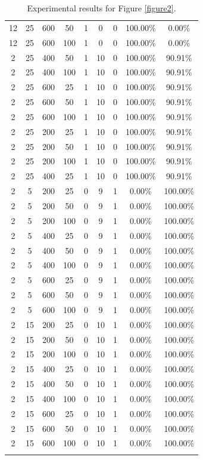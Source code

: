 {\begin{longtable}{| c | c | c | c | c | c | c | c | c |}
12 & 25 & 600 & 50 & 1 & 0 & 0 & 100.00\% & 0.00\% \\
12 & 25 & 600 & 100 & 1 & 0 & 0 & 100.00\% & 0.00\% \\
2 & 25 & 400 & 50 & 1 & 10 & 0 & 100.00\% & 90.91\% \\
2 & 25 & 400 & 100 & 1 & 10 & 0 & 100.00\% & 90.91\% \\
2 & 25 & 600 & 25 & 1 & 10 & 0 & 100.00\% & 90.91\% \\
2 & 25 & 600 & 50 & 1 & 10 & 0 & 100.00\% & 90.91\% \\
2 & 25 & 600 & 100 & 1 & 10 & 0 & 100.00\% & 90.91\% \\
2 & 25 & 200 & 25 & 1 & 10 & 0 & 100.00\% & 90.91\% \\
2 & 25 & 200 & 50 & 1 & 10 & 0 & 100.00\% & 90.91\% \\
2 & 25 & 200 & 100 & 1 & 10 & 0 & 100.00\% & 90.91\% \\
2 & 25 & 400 & 25 & 1 & 10 & 0 & 100.00\% & 90.91\% \\
2 & 5 & 200 & 25 & 0 & 9 & 1 & 0.00\% & 100.00\% \\
2 & 5 & 200 & 50 & 0 & 9 & 1 & 0.00\% & 100.00\% \\
2 & 5 & 200 & 100 & 0 & 9 & 1 & 0.00\% & 100.00\% \\
2 & 5 & 400 & 25 & 0 & 9 & 1 & 0.00\% & 100.00\% \\
2 & 5 & 400 & 50 & 0 & 9 & 1 & 0.00\% & 100.00\% \\
2 & 5 & 400 & 100 & 0 & 9 & 1 & 0.00\% & 100.00\% \\
2 & 5 & 600 & 25 & 0 & 9 & 1 & 0.00\% & 100.00\% \\
2 & 5 & 600 & 50 & 0 & 9 & 1 & 0.00\% & 100.00\% \\
2 & 5 & 600 & 100 & 0 & 9 & 1 & 0.00\% & 100.00\% \\
2 & 15 & 200 & 25 & 0 & 10 & 1 & 0.00\% & 100.00\% \\
2 & 15 & 200 & 50 & 0 & 10 & 1 & 0.00\% & 100.00\% \\
2 & 15 & 200 & 100 & 0 & 10 & 1 & 0.00\% & 100.00\% \\
2 & 15 & 400 & 25 & 0 & 10 & 1 & 0.00\% & 100.00\% \\
2 & 15 & 400 & 50 & 0 & 10 & 1 & 0.00\% & 100.00\% \\
2 & 15 & 400 & 100 & 0 & 10 & 1 & 0.00\% & 100.00\% \\
2 & 15 & 600 & 25 & 0 & 10 & 1 & 0.00\% & 100.00\% \\
2 & 15 & 600 & 50 & 0 & 10 & 1 & 0.00\% & 100.00\% \\
2 & 15 & 600 & 100 & 0 & 10 & 1 & 0.00\% & 100.00\% \\\hline
\caption{Experimental results for Figure \ref{figure2}.}
\label{table2}
\end{longtable}
}
\endgroup

